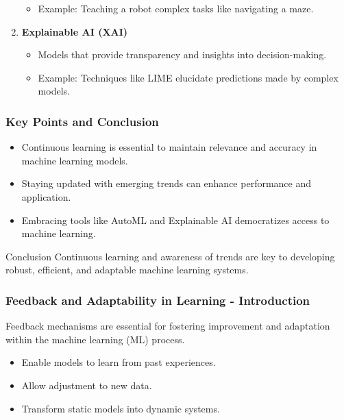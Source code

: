 \documentclass{beamer}
\begin{document}
\begin{frame}[fragile]
\begin{enumerate}
\begin{itemize}
                \item Example: Teaching a robot complex tasks like navigating a maze.
            \end{itemize}
        \item \textbf{Explainable AI (XAI)}
            \begin{itemize}
                \item Models that provide transparency and insights into decision-making.
                \item Example: Techniques like LIME elucidate predictions made by complex models.
            \end{itemize}
    \end{enumerate}
\end{frame}

\begin{frame}[fragile]
    \frametitle{Key Points and Conclusion}
    \begin{itemize}
        \item Continuous learning is essential to maintain relevance and accuracy in machine learning models.
        \item Staying updated with emerging trends can enhance performance and application.
        \item Embracing tools like AutoML and Explainable AI democratizes access to machine learning.
    \end{itemize}
    \begin{block}{Conclusion}
        Continuous learning and awareness of trends are key to developing robust, efficient, and adaptable machine learning systems.
    \end{block}
\end{frame}

\begin{frame}[fragile]
    \frametitle{Feedback and Adaptability in Learning - Introduction}
    Feedback mechanisms are essential for fostering improvement and adaptation within the machine learning (ML) process. 
    \begin{itemize}
        \item Enable models to learn from past experiences.
        \item Allow adjustment to new data.
        \item Transform static models into dynamic systems.
    \end{itemize}
\end{frame}
\end{document}
